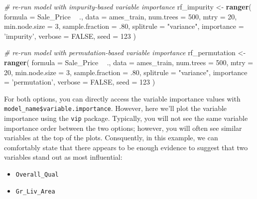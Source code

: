 \documentclass[]{book}
\newenvironment{Shaded}{\begin{snugshade}}{\end{snugshade}}
\newcommand{\CommentTok}[1]{\textcolor[rgb]{0.56,0.35,0.01}{\textit{#1}}}
\newcommand{\DataTypeTok}[1]{\textcolor[rgb]{0.13,0.29,0.53}{#1}}
\newcommand{\DecValTok}[1]{\textcolor[rgb]{0.00,0.00,0.81}{#1}}
\newcommand{\FloatTok}[1]{\textcolor[rgb]{0.00,0.00,0.81}{#1}}
\newcommand{\KeywordTok}[1]{\textcolor[rgb]{0.13,0.29,0.53}{\textbf{#1}}}
\newcommand{\NormalTok}[1]{#1}
\newcommand{\OperatorTok}[1]{\textcolor[rgb]{0.81,0.36,0.00}{\textbf{#1}}}
\newcommand{\OtherTok}[1]{\textcolor[rgb]{0.56,0.35,0.01}{#1}}
\newcommand{\StringTok}[1]{\textcolor[rgb]{0.31,0.60,0.02}{#1}}
\providecommand{\tightlist}{%
  \setlength{\itemsep}{0pt}\setlength{\parskip}{0pt}}
\theoremstyle{definition}
\theoremstyle{definition}
\theoremstyle{definition}
\theoremstyle{remark}
\begin{document}
\begin{Shaded}
\begin{Highlighting}[]
\CommentTok{# re-run model with impurity-based variable importance}
\NormalTok{rf_impurity <-}\StringTok{ }\KeywordTok{ranger}\NormalTok{(}
  \DataTypeTok{formula =}\NormalTok{ Sale_Price }\OperatorTok{~}\StringTok{ }\NormalTok{., }
  \DataTypeTok{data            =}\NormalTok{ ames_train, }
  \DataTypeTok{num.trees       =} \DecValTok{500}\NormalTok{,}
  \DataTypeTok{mtry            =} \DecValTok{20}\NormalTok{,}
  \DataTypeTok{min.node.size   =} \DecValTok{3}\NormalTok{,}
  \DataTypeTok{sample.fraction =} \FloatTok{.80}\NormalTok{,}
  \DataTypeTok{splitrule       =} \StringTok{"variance"}\NormalTok{,}
  \DataTypeTok{importance      =} \StringTok{'impurity'}\NormalTok{,}
  \DataTypeTok{verbose         =} \OtherTok{FALSE}\NormalTok{,}
  \DataTypeTok{seed            =} \DecValTok{123}
\NormalTok{  )}

\CommentTok{# re-run model with permutation-based variable importance}
\NormalTok{rf_permutation <-}\StringTok{ }\KeywordTok{ranger}\NormalTok{(}
  \DataTypeTok{formula =}\NormalTok{ Sale_Price }\OperatorTok{~}\StringTok{ }\NormalTok{., }
  \DataTypeTok{data            =}\NormalTok{ ames_train, }
  \DataTypeTok{num.trees       =} \DecValTok{500}\NormalTok{,}
  \DataTypeTok{mtry            =} \DecValTok{20}\NormalTok{,}
  \DataTypeTok{min.node.size   =} \DecValTok{3}\NormalTok{,}
  \DataTypeTok{sample.fraction =} \FloatTok{.80}\NormalTok{,}
  \DataTypeTok{splitrule       =} \StringTok{"variance"}\NormalTok{,}
  \DataTypeTok{importance      =} \StringTok{'permutation'}\NormalTok{,}
  \DataTypeTok{verbose         =} \OtherTok{FALSE}\NormalTok{,}
  \DataTypeTok{seed            =} \DecValTok{123}
\NormalTok{  )}
\end{Highlighting}
\end{Shaded}

For both options, you can directly access the variable importance values
with \texttt{model\_name\$variable.importance}. However, here we'll plot
the variable importance using the \texttt{vip} package. Typically, you
will not see the same variable importance order between the two options;
however, you will often see similar variables at the top of the plots.
Consquently, in this example, we can comfortably state that there
appears to be enough evidence to suggest that two variables stand out as
most influential:

\begin{itemize}
\tightlist
\item
  \texttt{Overall\_Qual}
\item
  \texttt{Gr\_Liv\_Area}
\end{itemize}
\end{document}
